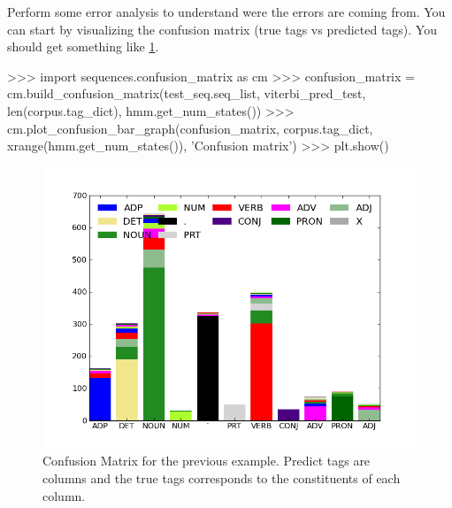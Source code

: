 \begin{exercise}
Perform some error analysis to understand were the errors are coming
from. You can start by visualizing the confusion matrix (true tags vs
predicted tags). You should get something like \ref{fig:cm_uns}.

\begin{python}
>>> import sequences.confusion_matrix as cm
>>> confusion_matrix = cm.build_confusion_matrix(test_seq.seq_list, viterbi_pred_test, len(corpus.tag_dict), hmm.get_num_states())
>>> cm.plot_confusion_bar_graph(confusion_matrix, corpus.tag_dict, xrange(hmm.get_num_states()), 'Confusion matrix')
>>> plt.show()
\end{python}

\begin{figure}
\centering
\includegraphics[scale=.5]{figs/sequences/cm_sup.png}
\caption{\label{fig:cm_uns} Confusion Matrix for the previous
  example. Predict tags are columns and the true tags corresponds to
  the constituents of each column.}
\end{figure}

\end{exercise}


%
%



